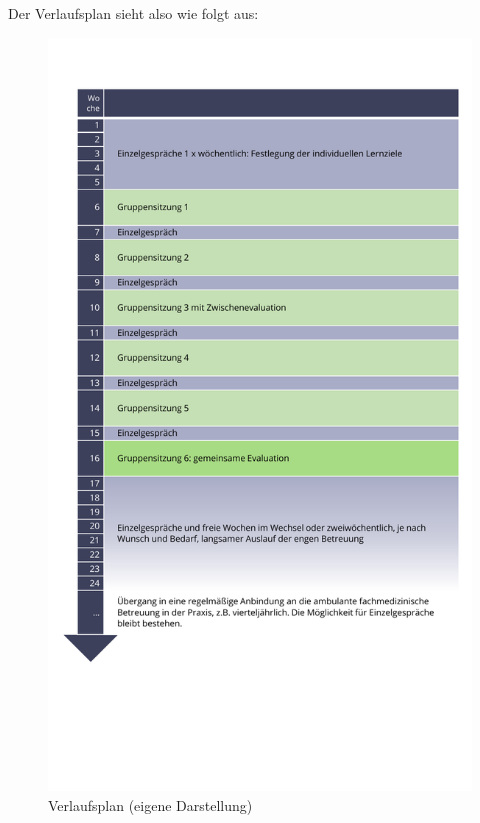 \documentclass[
  twoside,
  parskip=half-,
  paper=176mm:246mm,
  BCOR=14mm,
  DIV=14,
]{scrreprt}
\begin{document}
Der Verlaufsplan sieht also wie folgt aus:

\begin{figure}[h!]
  \centering
  \includegraphics[height=0.9\textheight]{Grafiken/Ablaufplan.pdf}
  \caption{Verlaufsplan (eigene Darstellung)}
  \label{fig:ablaufplan}
\end{figure}
\end{document}
